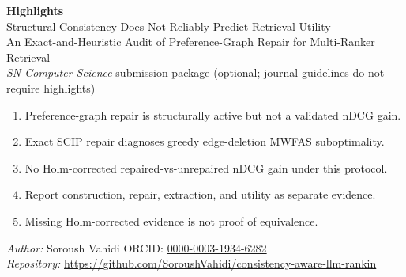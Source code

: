 \documentclass[11pt]{article}
\begin{document}
\begin{center}
{\Large\bfseries Highlights}\\[0.4em]
{\large Structural Consistency Does Not Reliably Predict Retrieval Utility}\\[0.25em]
{\normalsize An Exact-and-Heuristic Audit of Preference-Graph Repair for Multi-Ranker Retrieval}\\[0.35em]
{\small\textit{SN Computer Science} submission package (optional; journal guidelines do not require highlights)}
\end{center}

\vspace{1.25em}

\begin{enumerate}[leftmargin=1.5em,itemsep=0.85em]
  \item Preference-graph repair is structurally active but not a validated nDCG gain.
  \item Exact SCIP repair diagnoses greedy edge-deletion MWFAS suboptimality.
  \item No Holm-corrected repaired-vs-unrepaired nDCG gain under this protocol.
  \item Report construction, repair, extraction, and utility as separate evidence.
  \item Missing Holm-corrected evidence is not proof of equivalence.
\end{enumerate}

\vspace{1.5em}
\noindent\textit{Author:} Soroush Vahidi\quad
ORCID: \href{https://orcid.org/0000-0003-1934-6282}{0000-0003-1934-6282}\\
\textit{Repository:}
\url{https://github.com/SoroushVahidi/consistency-aware-llm-rankin}
\end{document}
